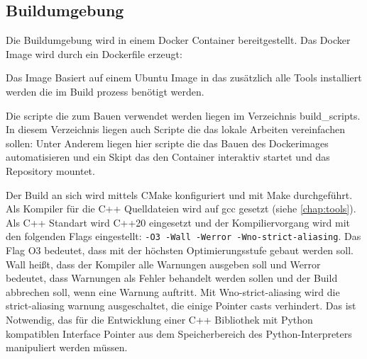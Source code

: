 

\subsection{Buildumgebung}
Die Buildumgebung wird in einem Docker Container bereitgestellt. Das Docker Image wird durch ein Dockerfile erzeugt:



Das Image Basiert auf einem Ubuntu Image in das zusätzlich alle Tools installiert werden die im Build prozess benötigt werden.

Die scripte die zum Bauen verwendet werden liegen im Verzeichnis \glqq build\_scripts\grqq{}. In diesem Verzeichnis liegen auch Scripte die das lokale Arbeiten vereinfachen sollen: Unter Anderem liegen hier scripte die das Bauen des Dockerimages automatisieren und ein Skipt das den Container interaktiv startet und das Repository mountet.

Der Build an sich wird mittels CMake konfiguriert und mit Make durchgeführt. Als Kompiler für die C++ Quelldateien wird auf gcc gesetzt (siehe \autoref{chap:tools}). Als C++ Standart wird C++20 eingesetzt und der Kompiliervorgang wird mit den folgenden Flags eingestellt: \lstinline{-O3 -Wall -Werror -Wno-strict-aliasing}. Das Flag O3 bedeutet, dass mit der höchsten Optimierungsstufe gebaut werden soll. Wall heißt, dass der Kompiler alle Warnungen ausgeben soll und Werror bedeutet, dass Warnungen als Fehler behandelt werden sollen und der Build abbrechen soll, wenn eine Warnung auftritt. Mit Wno-strict-aliasing wird die strict-aliasing warnung ausgeschaltet, die einige Pointer casts verhindert. Das ist Notwendig, das für die Entwicklung einer C++ Bibliothek mit Python kompatiblen Interface Pointer aus dem Speicherbereich des Python-Interpreters manipuliert werden müssen.
